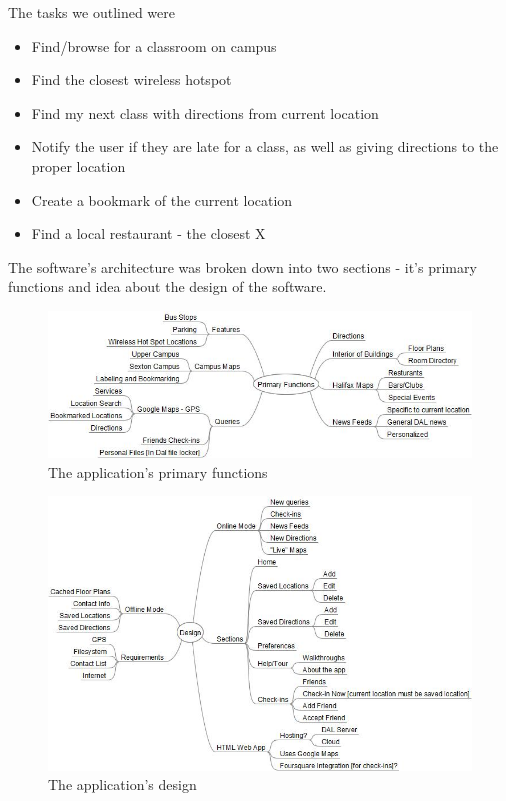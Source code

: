 \documentclass{article}
\begin{document}
The tasks we outlined were

\begin{itemize}
\item Find/browse for a classroom on campus
\item Find the closest wireless hotspot
\item Find my next class with directions from current location
\item Notify the user if they are late for a class, as well as giving directions to
the proper location
\item Create a bookmark of the current location
\item Find a local restaurant - the closest X
\end{itemize}

The software's architecture was broken down into two sections - it's primary
functions and idea about the design of the software.

\begin{figure}
\includegraphics[width=\textwidth]{img/Primary-Functions.jpg}
\caption{The application's primary functions}
\end{figure}

\begin{figure}
\includegraphics[width=\textwidth]{img/Design.jpg}
\caption{The application's design}
\end{figure}
\end{document}
